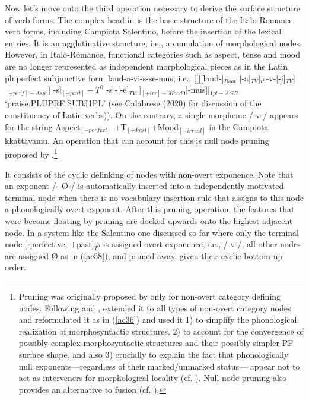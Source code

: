 \documentclass[output=paper]{langscibook}
\begin{document}
Now let's move onto the third operation necessary to derive the surface structure of verb forms. The complex head in   is the basic structure of the Italo-Romance verb forms, including Campiota Salentino, before the insertion of the lexical entries. It is an agglutinative structure, i.e., a cumulation of morphological nodes. However, in Italo-Romance, functional categories such as aspect, tense and mood are no longer represented as independent morphological pieces as in the Latin pluperfect subjunctive form laud-a-vi-s-se-mus, i.e., [[[[laud-]$_{Root}$ [-a]$_{TV}$]$_{v^0}$-v-[-i]$_{TV}$]$_{[+perf]-Asp^0}$] -s]$_{[+past]}-T^0$  -s -[-e]$_{TV}$ ]$_{[+irr]-Mood0}$]-mus][$_{1pl-AGR}$  ‘praise.PLUPRF.SUBJ1PL’ (see Calabrese (2020) for discussion of the constituency of Latin verbs)). On the contrary, a single morpheme /-v-/ appears for the string Aspect$_{[-perfect]}$ +T$_{[+Past]}$+Mood$_{[-irreal]}$ in the Campiota kkattavamu.  An operation that can account for this is null node pruning proposed by \cite{calabrese2019a}.\footnote{Pruning was originally proposed by \cite{embick2010a} only for non-overt category defining nodes. Following \cite{christopoulos2017a} and \cite{christopoulos2018a}, \cite{calabrese2019a} extended it to all types of non-overt category nodes and reformulated it as in (\ref{ac36}) and used it 1) to simplify the phonological realization of morphosyntactic structures, 2) to account for the convergence of possibly complex morphosyntactic structures and their possibly simpler PF surface shape, and also 3) crucially to explain the fact that phonologically null exponents—regardless of their marked/unmarked status— appear not to act as interveners for morphological locality (cf. \cite{embick2010a, calabrese2019a}). Null node pruning also provides an alternative to fusion (cf. \cite{halle1993a}).}
 
It consists of the cyclic delinking of nodes with non-overt exponence. Note that an exponent /- Ø-/ is automatically  inserted  into a independently motivated  terminal node when there is no vocabulary insertion rule that assigns to this node a phonologically overt exponent.  After this pruning operation, the features that were become floating by pruning are docked upwards onto the highest adjacent node.  In a system like the Salentino one discussed so far where only the terminal node [-perfective, +past]$_{T^0}$ is assigned overt exponence, i.e., /-v-/, all other nodes are assigned Ø as in (\ref{ac58}), and pruned away, given their cyclic bottom up order.
\end{document}
